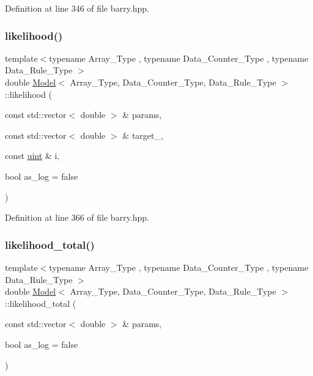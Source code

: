 Definition at line 346 of file barry.\+hpp.

\mbox{\label{classbarry_1_1_model_ab88f541fc010f0ee1a415c9cb6c292b7}} 
\subsubsection{\texorpdfstring{likelihood()}{likelihood()}\hspace{0.1cm}{\footnotesize\ttfamily [3/3]}}
{\footnotesize\ttfamily template$<$typename Array\+\_\+\+Type , typename Data\+\_\+\+Counter\+\_\+\+Type , typename Data\+\_\+\+Rule\+\_\+\+Type $>$ \\
double \hyperlink{classbarry_1_1_model}{Model}$<$ Array\+\_\+\+Type, Data\+\_\+\+Counter\+\_\+\+Type, Data\+\_\+\+Rule\+\_\+\+Type $>$\+::likelihood (\begin{DoxyParamCaption}\item[{const std\+::vector$<$ double $>$ \&}]{params,  }\item[{const std\+::vector$<$ double $>$ \&}]{target\+\_\+,  }\item[{const \hyperlink{namespacebarry_a11dfc53ddb4672278319aa04f1e09a6c}{uint} \&}]{i,  }\item[{bool}]{as\+\_\+log = {\ttfamily false} }\end{DoxyParamCaption})\hspace{0.3cm}{\ttfamily [inline]}}



Definition at line 366 of file barry.\+hpp.

\mbox{\label{classbarry_1_1_model_a31d16ef478d772cedde0813575074a0f}} 
\subsubsection{\texorpdfstring{likelihood\+\_\+total()}{likelihood\_total()}}
{\footnotesize\ttfamily template$<$typename Array\+\_\+\+Type , typename Data\+\_\+\+Counter\+\_\+\+Type , typename Data\+\_\+\+Rule\+\_\+\+Type $>$ \\
double \hyperlink{classbarry_1_1_model}{Model}$<$ Array\+\_\+\+Type, Data\+\_\+\+Counter\+\_\+\+Type, Data\+\_\+\+Rule\+\_\+\+Type $>$\+::likelihood\+\_\+total (\begin{DoxyParamCaption}\item[{const std\+::vector$<$ double $>$ \&}]{params,  }\item[{bool}]{as\+\_\+log = {\ttfamily false} }\end{DoxyParamCaption})\hspace{0.3cm}{\ttfamily [inline]}}



